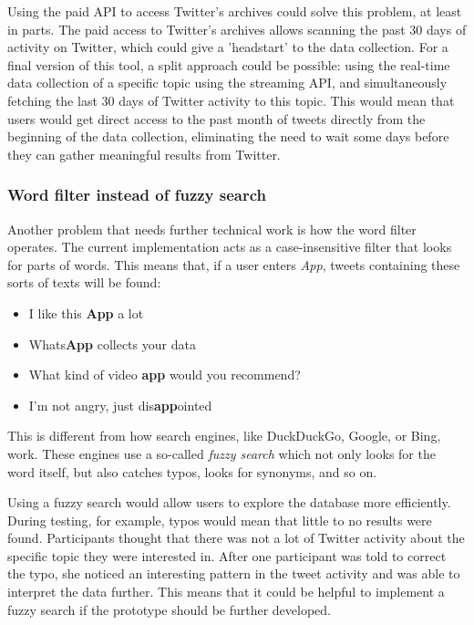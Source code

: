 Using the paid API to access Twitter's archives could solve this problem, at least in parts. The paid access to Twitter's archives allows scanning the past 30 days of activity on Twitter, which could give a 'headstart' to the data collection. For a final version of this tool, a split approach could be possible: using the real-time data collection of a specific topic using the streaming API, and simultaneously fetching the last 30 days of Twitter activity to this topic. This would mean that users would get direct access to the past month of tweets directly from the beginning of the data collection, eliminating the need to wait some days before they can gather meaningful results from Twitter.

\subsubsection*{Word filter instead of fuzzy search}
Another problem that needs further technical work is how the word filter operates. The current implementation acts as a case-insensitive filter that looks for parts of words. This means that, if a user enters \emph{App}, tweets containing these sorts of texts will be found:

\begin{itemize}
    \item I like this \textbf{App} a lot
    \item Whats\textbf{App} collects your data
    \item What kind of video \textbf{app} would you recommend?
    \item I'm not angry, just dis\textbf{app}ointed
\end{itemize}

This is different from how search engines, like DuckDuckGo, Google, or Bing, work. These engines use a so-called \emph{fuzzy search} which not only looks for the word itself, but also catches typos, looks for synonyms, and so on.

Using a fuzzy search would allow users to explore the database more efficiently. During testing, for example, typos would mean that little to no results were found. Participants thought that there was not a lot of Twitter activity about the specific topic they were interested in. After one participant was told to correct the typo, she noticed an interesting pattern in the tweet activity and was able to interpret the data further. This means that it could be helpful to implement a fuzzy search if the prototype should be further developed.

